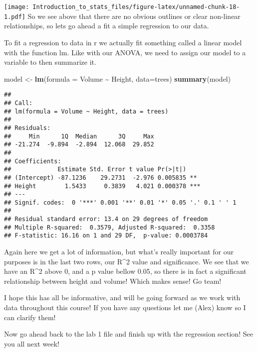 \documentclass[
]{article}
\newenvironment{Shaded}{\begin{snugshade}}{\end{snugshade}}
\newcommand{\CommentTok}[1]{\textcolor[rgb]{0.56,0.35,0.01}{\textit{#1}}}
\newcommand{\DataTypeTok}[1]{\textcolor[rgb]{0.13,0.29,0.53}{#1}}
\newcommand{\KeywordTok}[1]{\textcolor[rgb]{0.13,0.29,0.53}{\textbf{#1}}}
\newcommand{\NormalTok}[1]{#1}
\newcommand{\OperatorTok}[1]{\textcolor[rgb]{0.81,0.36,0.00}{\textbf{#1}}}
\newcommand{\StringTok}[1]{\textcolor[rgb]{0.31,0.60,0.02}{#1}}
\begin{document}
\begin{Shaded}
\end{Shaded}

\texttt{[image: Introduction\_to\_stats\_files/figure-latex/unnamed-chunk-18-1.pdf]}
So we see above that there are no obvious outlines or clear non-linear
relationships, so lets go ahead a fit a simple regression to our data.

To fit a regression to data in r we actually fit something called a
linear model with the function lm. Like with our ANOVA, we need to
assign our model to a variable to then summarize it.

\begin{Shaded}
\begin{Highlighting}[]
\NormalTok{model \textless{}{-}}\StringTok{ }\KeywordTok{lm}\NormalTok{(}\DataTypeTok{formula =}\NormalTok{ Volume }\OperatorTok{\textasciitilde{}}\StringTok{ }\NormalTok{Height, }\DataTypeTok{data=}\NormalTok{trees)}
\KeywordTok{summary}\NormalTok{(model)}
\end{Highlighting}
\end{Shaded}

\begin{verbatim}
## 
## Call:
## lm(formula = Volume ~ Height, data = trees)
## 
## Residuals:
##     Min      1Q  Median      3Q     Max 
## -21.274  -9.894  -2.894  12.068  29.852 
## 
## Coefficients:
##             Estimate Std. Error t value Pr(>|t|)    
## (Intercept) -87.1236    29.2731  -2.976 0.005835 ** 
## Height        1.5433     0.3839   4.021 0.000378 ***
## ---
## Signif. codes:  0 '***' 0.001 '**' 0.01 '*' 0.05 '.' 0.1 ' ' 1
## 
## Residual standard error: 13.4 on 29 degrees of freedom
## Multiple R-squared:  0.3579, Adjusted R-squared:  0.3358 
## F-statistic: 16.16 on 1 and 29 DF,  p-value: 0.0003784
\end{verbatim}

Again here we get a lot of information, but what's really important for
our purposes is in the last two rows, our R\^{}2 value and significance.
We see that we have an R\^{}2 above 0, and a p value bellow 0.05, so
there is in fact a significant relationship between height and volume!
Which makes sense! Go team!

I hope this has all be informative, and will be going forward as we work
with data throughout this course! If you have any questions let me
(Alex) know so I can clarify them!

Now go ahead back to the lab 1 file and finish up with the regression
section! See you all next week!
\end{document}
